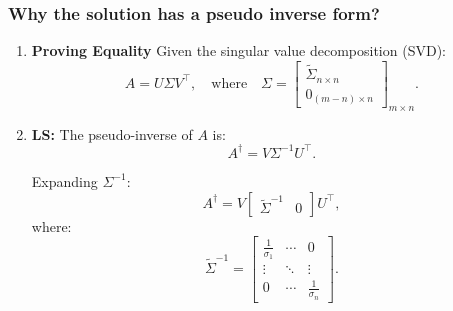 \subsubsection{Why the solution has a pseudo inverse form?}
\begin{intuition}
    \begin{enumerate}
        \item \textbf{Proving Equality} Given the singular value decomposition (SVD):
        \[
        A = U \Sigma V^\top, \quad \text{where} \quad \Sigma = 
        \begin{bmatrix}
        \tilde{\Sigma}_{n\times n} \\
        0_{(m-n) \times n}
        \end{bmatrix}_{m \times n}.
        \]
        
        \item \textbf{LS:} The pseudo-inverse of \(A\) is:
        \[
        A^\dagger = V \Sigma^{-1} U^\top.
        \]

        Expanding \( \Sigma^{-1} \):
        \[
        A^\dagger = V 
        \begin{bmatrix}
        \tilde{\Sigma}^{-1} & 0
        \end{bmatrix}
        U^\top,
        \]
        where:
        \[
        \tilde{\Sigma}^{-1} =
        \begin{bmatrix}
        \frac{1}{\sigma_1} & \cdots & 0 \\
        \vdots & \ddots & \vdots \\
        0 & \cdots & \frac{1}{\sigma_n}
        \end{bmatrix}.
        \]
        

\end{enumerate}
\end{intuition}

